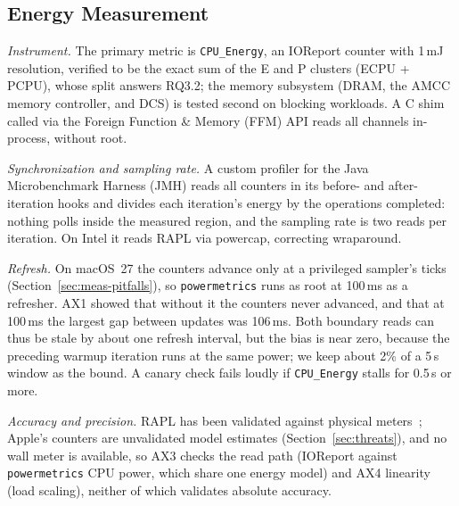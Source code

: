 \subsection{Energy Measurement}\label{sec:meas-energy}
\emph{Instrument.} The primary metric is \texttt{CPU\_Energy}, an IOReport counter with 1\,mJ resolution, verified to be the exact sum of the E and P clusters (ECPU + PCPU), whose split answers RQ3.2; the memory subsystem (DRAM, the AMCC memory controller, and DCS) is tested second on blocking workloads. A C shim called via the Foreign Function \& Memory (FFM) API reads all channels in-process, without root.

\emph{Synchronization and sampling rate.} A custom profiler for the Java Microbenchmark Harness (JMH) reads all counters in its before- and after-iteration hooks and divides each iteration's energy by the operations completed: nothing polls inside the measured region, and the sampling rate is two reads per iteration. On Intel it reads RAPL via powercap, correcting wraparound.

\emph{Refresh.} On macOS~27 the counters advance only at a privileged sampler's ticks (Section~\ref{sec:meas-pitfalls}), so \texttt{powermetrics} runs as root at 100\,ms as a refresher. AX1 showed that without it the counters never advanced, and that at 100\,ms the largest gap between updates was 106\,ms. Both boundary reads can thus be stale by about one refresh interval, but the bias is near zero, because the preceding warmup iteration runs at the same power; we keep about 2\% of a 5\,s window as the bound. A canary check fails loudly if \texttt{CPU\_Energy} stalls for 0.5\,s or more.

\emph{Accuracy and precision.} RAPL has been validated against physical meters~\cite{khan2018rapl}; Apple's counters are unvalidated model estimates (Section~\ref{sec:threats}), and no wall meter is available, so AX3 checks the read path (IOReport against \texttt{powermetrics} CPU power, which share one energy model) and AX4 linearity (load scaling), neither of which validates absolute accuracy.

